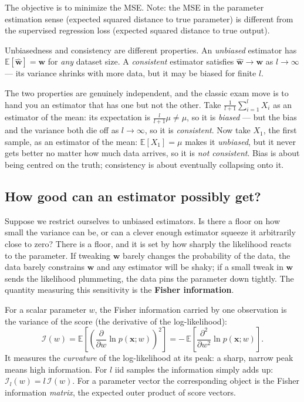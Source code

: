 \documentclass[11pt, oneside]{book}
\newcommand{\E}{\mathbb{E}}
\newcommand{\pd}[2]{\frac{\partial #1}{\partial #2}}
\newcommand{\pdd}[2]{\frac{\partial^2 #1}{\partial #2^2}}
\newcommand{\wvec}{\bm{w}}
\newcommand{\what}{\hat{\bm{w}}}
\newcommand{\xvec}{\bm{x}}
\begin{document}
The objective is to minimize the MSE.
Note: the MSE in the parameter estimation sense (expected squared distance to true
parameter) is different from the supervised regression loss (expected squared distance
to true output).

\begin{intbox}
  Unbiasedness and consistency are different properties.
  An \emph{unbiased} estimator has $\E[\what] = \wvec$ for \emph{any} dataset size.
  A \emph{consistent} estimator satisfies $\what \to \wvec$ as $l \to \infty$ ---
  its variance shrinks with more data, but it may be biased for finite $l$.
\end{intbox}

The two properties are genuinely independent, and the classic exam move is to
hand you an estimator that has one but not the other.
Take $\frac{1}{l+1}\sum_{i=1}^{l} X_i$ as an estimator of the mean: its
expectation is $\frac{l}{l+1}\mu \neq \mu$, so it is \emph{biased} --- but the
bias and the variance both die off as $l\to\infty$, so it is \emph{consistent}.
Now take $X_1$, the first sample, as an estimator of the mean: $\E[X_1]=\mu$
makes it \emph{unbiased}, but it never gets better no matter how much data
arrives, so it is \emph{not consistent}.
Bias is about being centred on the truth; consistency is about eventually
collapsing onto it.

\subsection{How good can an estimator possibly get?}

Suppose we restrict ourselves to unbiased estimators.
Is there a floor on how small the variance can be, or can a clever enough
estimator squeeze it arbitrarily close to zero?
There is a floor, and it is set by how sharply the likelihood reacts to the
parameter.
If tweaking $\wvec$ barely changes the probability of the data, the data barely
constrains $\wvec$ and any estimator will be shaky; if a small tweak in $\wvec$
sends the likelihood plummeting, the data pins the parameter down tightly.
The quantity measuring this sensitivity is the \textbf{Fisher information}.

\begin{defbox}[title={Fisher Information (scalar parameter)}]
For a scalar parameter $w$, the Fisher information carried by one observation is the
variance of the score (the derivative of the log-likelihood):
\[
  \mathcal{I}(w)
  = \E\!\left[\left(\pd{}{w}\ln p(\xvec;w)\right)^{\!2}\right]
  = -\,\E\!\left[\pdd{}{w}\ln p(\xvec;w)\right].
\]
It measures the \emph{curvature} of the log-likelihood at its peak: a sharp,
narrow peak means high information.
For $l$ iid samples the information simply adds up: $\mathcal{I}_l(w) = l\,\mathcal{I}(w)$.
For a parameter vector the corresponding object is the Fisher information \emph{matrix},
the expected outer product of score vectors.
\end{defbox}
\end{document}
